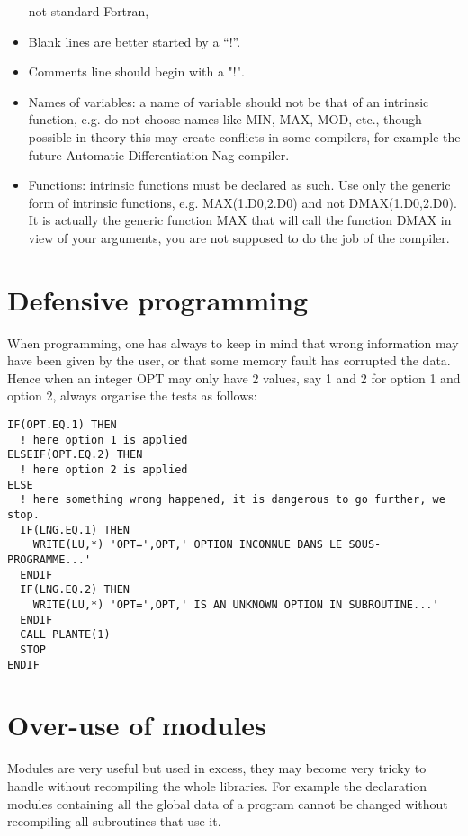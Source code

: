 \begin{itemize}
not standard Fortran,
\item Blank lines are better started by a “!”.
\item Comments line should begin with a "!".
\item Names of variables: a name of variable should not be that of an intrinsic
function, e.g. do not choose names like MIN, MAX, MOD, etc., though possible in
theory this may create conflicts in some compilers, for example the future
Automatic Differentiation Nag compiler.
\item Functions: intrinsic functions must be declared as such. Use only the
generic form of intrinsic functions, e.g. MAX(1.D0,2.D0) and not
DMAX(1.D0,2.D0). It is actually the generic function MAX that will call the
function DMAX in view of your arguments, you are not supposed to do the job of
the compiler.
\end{itemize}

\section{Defensive programming}

When programming, one has always to keep in mind that wrong information may
have been given by the user, or that some memory fault has corrupted the data.
Hence when an integer OPT may only have 2 values, say 1 and 2 for option 1 and
option 2, always organise the tests as follows:\\
\begin{lstlisting}
IF(OPT.EQ.1) THEN
  ! here option 1 is applied
ELSEIF(OPT.EQ.2) THEN
  ! here option 2 is applied
ELSE
  ! here something wrong happened, it is dangerous to go further, we stop.
  IF(LNG.EQ.1) THEN
    WRITE(LU,*) 'OPT=',OPT,' OPTION INCONNUE DANS LE SOUS-PROGRAMME...'
  ENDIF
  IF(LNG.EQ.2) THEN
    WRITE(LU,*) 'OPT=',OPT,' IS AN UNKNOWN OPTION IN SUBROUTINE...'
  ENDIF
  CALL PLANTE(1)
  STOP
ENDIF
\end{lstlisting}

\section{Over-use of modules}

Modules are very useful but used in excess, they may become very tricky to
handle without recompiling the whole libraries. For example the declaration
modules containing all the global data of a program cannot be changed without
recompiling all subroutines that use it.


